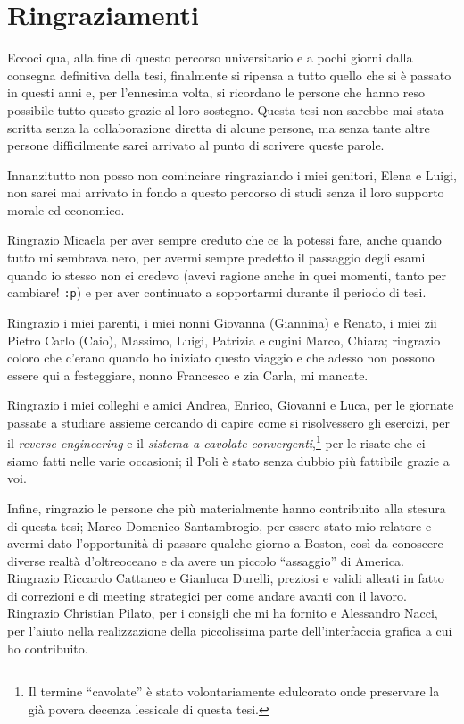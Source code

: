 \chapter*{Ringraziamenti}
Eccoci qua, alla fine di questo percorso universitario e a pochi giorni dalla consegna
definitiva della tesi, finalmente si ripensa a tutto quello che si \`e passato
in questi anni e, per l'ennesima volta, si ricordano le persone che hanno reso possibile tutto
questo grazie al loro sostegno.
Questa tesi non sarebbe mai stata scritta senza la collaborazione diretta di alcune
persone, ma senza tante altre persone difficilmente sarei arrivato al punto
di scrivere queste parole.

Innanzitutto non posso non cominciare ringraziando i miei genitori, Elena e Luigi,
non sarei mai arrivato in fondo a questo percorso di studi senza il loro supporto
morale ed economico.

Ringrazio Micaela per aver sempre creduto che ce la potessi fare, anche quando
tutto mi sembrava nero, per avermi sempre predetto il passaggio degli esami
quando io stesso non ci credevo (avevi ragione anche in quei momenti,
tanto per cambiare! \verb+:p+) e per aver continuato a sopportarmi durante il periodo
di tesi.

Ringrazio i miei parenti, i miei nonni Giovanna (Giannina) e Renato,
i miei zii Pietro Carlo (Caio), Massimo, Luigi, Patrizia e cugini Marco, Chiara;
ringrazio coloro che c'erano quando ho iniziato questo viaggio e che adesso
non possono essere qui a festeggiare, nonno Francesco e zia Carla, mi mancate.

Ringrazio i miei colleghi e amici Andrea, Enrico, Giovanni e Luca, per le giornate passate
a studiare assieme cercando di capire come si risolvessero gli esercizi,
per il \emph{reverse engineering} e il \emph{sistema a cavolate convergenti},\footnote{Il
termine ``cavolate'' \`e stato volontariamente edulcorato onde preservare
la gi\`a povera decenza lessicale di questa tesi.} per le risate che ci siamo
fatti nelle varie occasioni; il Poli \`e stato senza dubbio pi\`u fattibile
grazie a voi.

Infine, ringrazio le persone che pi\`u materialmente hanno contribuito
alla stesura di questa tesi; Marco Domenico Santambrogio, per essere stato
mio relatore e avermi dato l'opportunit\`a di passare qualche giorno a
Boston, cos\`i da conoscere diverse realt\`a d'oltreoceano e da avere un piccolo
``assaggio'' di America. Ringrazio Riccardo Cattaneo e Gianluca Durelli, preziosi e validi
alleati in fatto di correzioni e di meeting strategici per come andare avanti con
il lavoro. Ringrazio Christian Pilato, per i consigli che mi ha fornito e Alessandro
Nacci, per l'aiuto nella realizzazione della piccolissima parte dell'interfaccia
grafica a cui ho contribuito.


